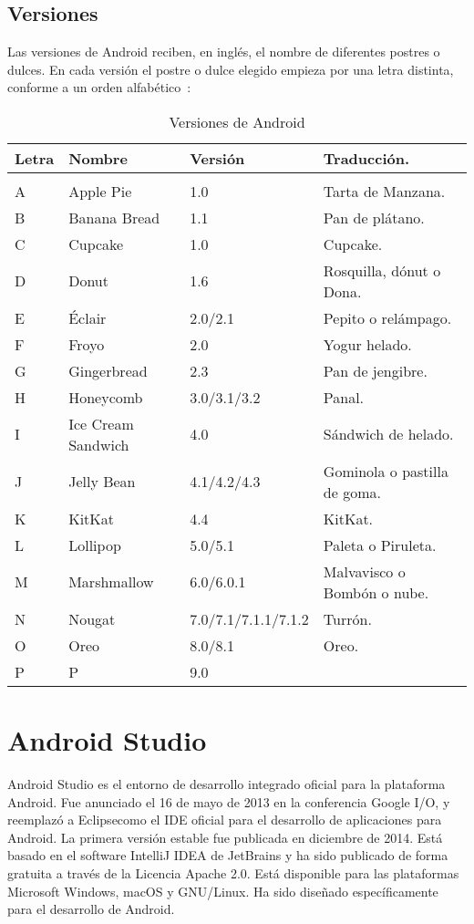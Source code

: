 \subsection{Versiones}
Las versiones de Android reciben, en inglés, el nombre de diferentes postres o dulces. En cada versión el postre o dulce elegido empieza por una letra distinta, conforme a un orden alfabético~\cite{wiki:android}:
\begin{table}[]
	\centering
	\caption{Versiones de Android}
	\label{tabla:versionesAndroid}
	\begin{tabular}{l l l l}
	\toprule
	Letra     & Nombre 		& Versión             & Traducción.\\ 	\midrule    \\ 	
	A         & Apple Pie   & 1.0           	  & Tarta de Manzana.\\ 
	B         & Banana Bread   & 1.1           	  & Pan de plátano.\\ 
	C         & Cupcake   	& 1.0           	  & Cupcake.\\ 
	D         & Donut   	& 1.6           	  & Rosquilla, dónut o Dona.\\ 
	E         & Éclair		& 2.0/2.1             & Pepito o relámpago.\\ 
	F         & Froyo		& 2.0           	  & Yogur helado.\\ 
	G         & Gingerbread & 2.3           	  & Pan de jengibre.\\ 
	H         & Honeycomb   & 3.0/3.1/3.2     	  & Panal.\\ 
	I         & Ice Cream Sandwich    & 4.0       & Sándwich de helado.\\ 
	J         & Jelly Bean    & 4.1/4.2/4.3       & Gominola o pastilla de goma.\\
	K         & KitKat    	& 4.4           	  & KitKat.\\ 
	L         & Lollipop    & 5.0/5.1             & Paleta o Piruleta.\\ 
	M         & Marshmallow & 6.0/6.0.1           & Malvavisco o Bombón o nube.\\ 
	N         & Nougat    	& 7.0/7.1/7.1.1/7.1.2 & Turrón.\\ 
	O         & Oreo    	& 8.0/8.1             & Oreo.\\ 
	P         & P		    & 9.0           	  &  
\\ \bottomrule
\end{tabular}
\end{table}
\newpage
\section{Android Studio}
Android Studio es el entorno de desarrollo integrado oficial para la plataforma Android. Fue anunciado el 16 de mayo de 2013 en la conferencia Google I/O, y reemplazó a Eclipsecomo el IDE oficial para el desarrollo de aplicaciones para Android. La primera versión estable fue publicada en diciembre de 2014.
Está basado en el software IntelliJ IDEA de JetBrains y ha sido publicado de forma gratuita a través de la Licencia Apache 2.0. Está disponible para las plataformas Microsoft Windows, macOS y GNU/Linux. Ha sido diseñado específicamente para el desarrollo de Android.
